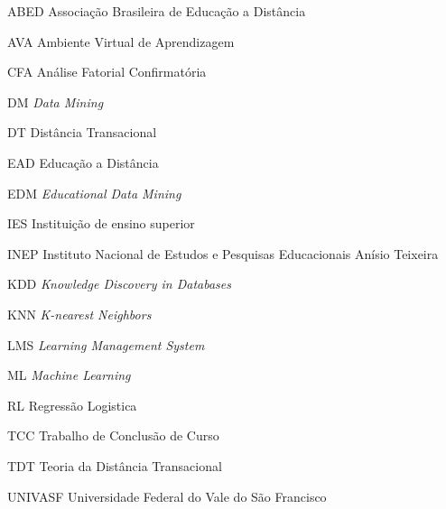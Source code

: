 \begin{siglas}
  \item[ABED] Associação Brasileira de Educação a Distância
  \item[AVA] Ambiente Virtual de Aprendizagem
  \item[CFA] Análise Fatorial Confirmatória
  \item[DM] \textit{Data Mining}
  \item[DT] Distância Transacional
  \item[EAD] Educação a Distância
  \item[EDM] \textit{Educational Data Mining}
  \item[IES] Instituição de ensino superior
  \item[INEP] Instituto Nacional de Estudos e Pesquisas Educacionais Anísio Teixeira
  \item[KDD] \textit{Knowledge Discovery in Databases}
  \item[KNN] \textit{K-nearest Neighbors}
  \item[LMS] \textit{Learning Management System}
  \item[ML] \textit{Machine Learning}
  \item[RL] Regressão Logistica
  \item[TCC] Trabalho de Conclusão de Curso
  \item[TDT] Teoria da Distância Transacional
  \item[UNIVASF] Universidade Federal do Vale do São Francisco
\end{siglas}

\tableofcontents*
\cleardoublepage


